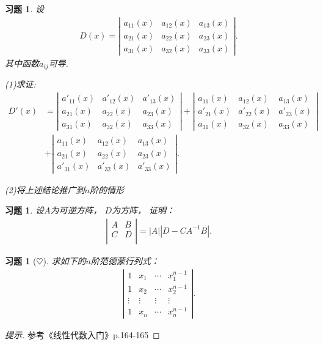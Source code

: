 \documentclass[UTF8]{ctexart}
\newtheorem{ex}[thm]{习题}
\begin{document}
\begin{ex}
设
\begin{eqnarray*}
D(x)=\left|
\begin{array}{ccc}
a_{11}(x) &a_{12}(x) &a_{13}(x)\\
a_{21}(x) &a_{22}(x) &a_{23}(x)\\
a_{31}(x) &a_{32}(x) &a_{33}(x)
\end{array}
\right|.
\end{eqnarray*}
其中函数$a_{ij}$可导.

(1)求证:\begin{eqnarray*}
D'(x)&=\left|
\begin{array}{ccc}
a'_{11}(x) &a'_{12}(x) &a'_{13}(x)\\
a_{21}(x) &a_{22}(x) &a_{23}(x)\\
a_{31}(x) &a_{32}(x) &a_{33}(x)
\end{array}
\right|+\left|
\begin{array}{ccc}
a_{11}(x) &a_{12}(x) &a_{13}(x)\\
a'_{21}(x) &a'_{22}(x) &a'_{23}(x)\\
a_{31}(x) &a_{32}(x) &a_{33}(x)
\end{array}
\right|\\&+\left|
\begin{array}{ccc}
a_{11}(x) &a_{12}(x) &a_{13}(x)\\
a_{21}(x) &a_{22}(x) &a_{23}(x)\\
a'_{31}(x) &a'_{32}(x) &a'_{33}(x)
\end{array}
\right|.
\end{eqnarray*}

(2)将上述结论推广到$n$阶的情形

\end{ex}


\begin{ex}
	设$A$为可逆方阵， $D$为方阵， 证明：
\begin{eqnarray*}
\left|
\begin{array}{cc}
A &B\\
C &D\\
\end{array}
\right|=|A||D-CA^{-1}B|.
\end{eqnarray*}
	\end{ex}



\begin{ex}[$\heartsuit $]
求如下的$n$阶范德蒙行列式：
\begin{eqnarray*}
\left|
\begin{array}{ccccc}
1 & x_1 & \cdots & x_1^{n-1}  \\
1 & x_2 & \cdots & x_2^{n-1}\\
\vdots & \vdots & \vdots & \vdots \\
1 & x_n & \cdots & x_n^{n-1}
\end{array}
\right|.
\end{eqnarray*}
\end{ex}
\begin{proof}[提示]参考《线性代数入门》p.164-165
\end{proof}
\end{document}
